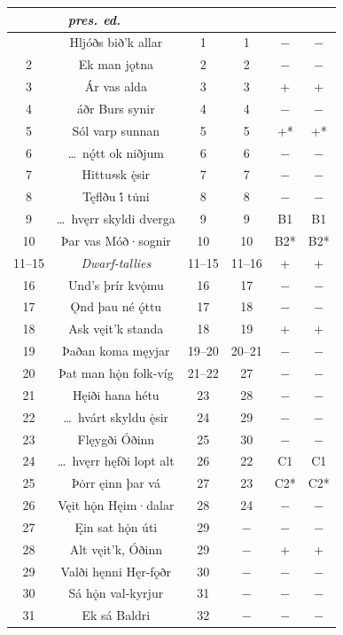 {\small \begin{longtable}{|c c c c c c|}
	\hline
	\multicolumn{2}{|c}{\emph{pres. ed.}} & \Regius & \Hauksbok & \RegiusProse\Trajectinus\Wormianus & \Upsaliensis \\ [0.5ex]
	\hline\hline\endhead
	\hline\endfoot
	1 & Hljóðs bið’k allar & 1 & 1 & − & − \\
	2 & Ek man jǫtna & 2 & 2 & − & − \\
	3 & Ár vas alda & 3 & 3 & + & + \\
	4 & áðr Burs synir & 4 & 4 & − & − \\
	5 & Sól varp sunnan & 5 & 5 & +* & +* \\
	6 & \dots\ nǫ́tt ok niðjum & 6 & 6 & − & − \\
	7 & Hittu⸗sk ę̇sir & 7 & 7 & − & − \\
	8 & Tęflðu i̇́ tu̇ni & 8 & 8 & − & − \\
	9 & \dots\ hvęrr skyldi dverga & 9 & 9 & B1 & B1 \\
	10 & Þar vas Móð·sognir & 10 & 10 & B2* & B2* \\
	11--15 & \emph{Dwarf-tallies} & 11--15 & 11--16 & + & + \\
	16 & Und’s þrír kvǫ̇mu & 16 & 17 & − & − \\
	17 & Ǫnd þau né ǫ́ttu & 17 & 18 & − & − \\
	18 & Ask vęit’k standa & 18 & 19 & + & + \\
	19 & Þaðan koma męyjar & 19--20 & 20--21 & − & − \\
	20 & Þat man hǫ̇n folk-víg & 21--22 & 27 & − & − \\
	21 & Hęiði hana hétu & 23 & 28 & − & − \\
	22 & \dots\ hvárt skyldu ę̇sir & 24 & 29 & − & − \\
	23 & Flęygði Óðinn & 25 & 30 & − & − \\
	24 & \dots\ hvęrr hęfði lopt alt & 26 & 22 & C1 & C1 \\
	25 & Þȯrr ęinn þar vá & 27 & 23 & C2* & C2* \\
	26 & Vęit hǫ̇n Hęim·dalar & 28 & 24 & − & − \\
	27 & Ęin sat hǫ̇n úti & 29 & − & − & − \\
	28 & Alt vęit’k, Óðinn & 29 & − & + & + \\
	29 & Valði hęnni Hęr-fǫðr & 30 & − & − & − \\
	30 & Sá hǫ̇n val-kyrjur & 31 & − & − & − \\
	31 & Ek sá Baldri & 32 & − & − & − \\

\end{longtable}}

